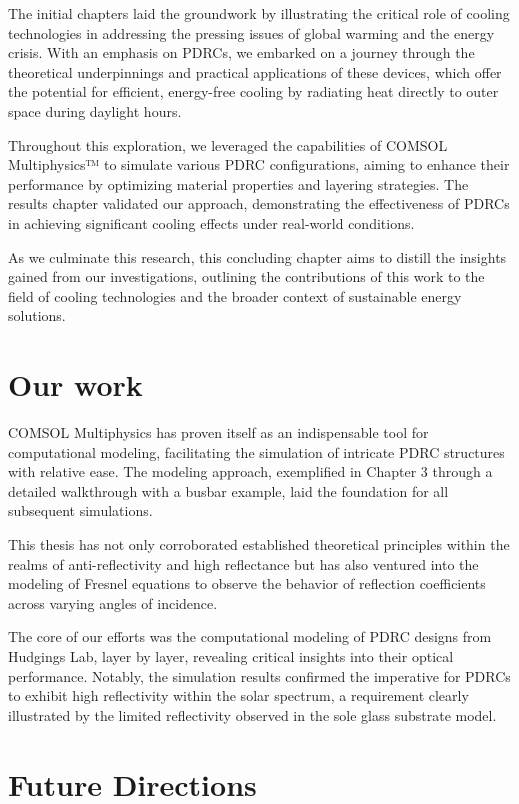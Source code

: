 The initial chapters laid the groundwork by illustrating the critical role of cooling technologies in addressing the pressing issues of global warming and the energy crisis. With an emphasis on PDRCs, we embarked on a journey through the theoretical underpinnings and practical applications of these devices, which offer the potential for efficient, energy-free cooling by radiating heat directly to outer space during daylight hours.

Throughout this exploration, we leveraged the capabilities of COMSOL Multiphysics™ to simulate various PDRC configurations, aiming to enhance their performance by optimizing material properties and layering strategies. The results chapter validated our approach, demonstrating the effectiveness of PDRCs in achieving significant cooling effects under real-world conditions.

As we culminate this research, this concluding chapter aims to distill the insights gained from our investigations, outlining the contributions of this work to the field of cooling technologies and the broader context of sustainable energy solutions.

\section{Our work}

COMSOL Multiphysics \texttrademark \space has proven itself as an indispensable tool for computational modeling, facilitating the simulation of intricate PDRC structures with relative ease. The modeling approach, exemplified in Chapter 3 through a detailed walkthrough with a busbar example, laid the foundation for all subsequent simulations.

This thesis has not only corroborated established theoretical principles within the realms of anti-reflectivity and high reflectance but has also ventured into the modeling of Fresnel equations to observe the behavior of reflection coefficients across varying angles of incidence.

The core of our efforts was the computational modeling of PDRC designs from Hudgings Lab, layer by layer, revealing critical insights into their optical performance. Notably, the simulation results confirmed the imperative for PDRCs to exhibit high reflectivity within the solar spectrum, a requirement clearly illustrated by the limited reflectivity observed in the sole glass substrate model.

\section{Future Directions}

